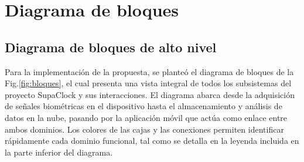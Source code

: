 \documentclass[letterpaper,11pt]{article}
\newcommand{\rfigura}[1]{Fig.\ref{#1}}
\begin{document}
\section{Diagrama de bloques}

\subsection{Diagrama de bloques de alto nivel }

Para la implementación de la propuesta, se planteó el diagrama de bloques de la \rfigura{fig:bloques}, el cual presenta una vista integral de todos los subsistemas del proyecto SupaClock y sus interacciones. El diagrama abarca desde la adquisición de señales biométricas en el dispositivo hasta el almacenamiento y análisis de datos en la nube, pasando por la aplicación móvil que actúa como enlace entre ambos dominios. Los colores de las cajas y las conexiones permiten identificar rápidamente cada dominio funcional, tal como se detalla en la leyenda incluida en la parte inferior del diagrama.
\end{document}

